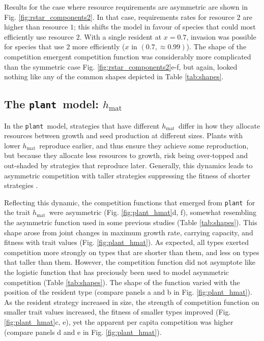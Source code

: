 \documentclass[a4paper,11pt]{article}
\newcommand{\plant}{{\tt plant}}
\newcommand{\hmat}{\ensuremath{h_{\text{mat}}}}
\begin{document}
Results for the case where resource requirements are asymmetric are shown in Fig. \ref{fig:rstar_components2}. In that case, requirements rates for resource $2$ are higher than resource $1$; this shifts the model in favour of species that could most efficiently use resource $2$. With a single resident at $x = 0.7$, invasion was possible for species that use $2$ more efficiently ($x$ in $(0.7, \approx 0.99)$). The shape of the competition emergent competition function was considerably more complicated than the symmetric case Fig. \ref{fig:rstar_components2}e-f, but again, looked nothing like any of the common shapes depicted in Table \ref{tab:shapes}.

\subsection{The \plant\ model: \hmat}

In the \plant\ model, strategies that have different \hmat\ differ in how they allocate resources between growth and seed production at different sizes. Plants with lower \hmat\ reproduce earlier, and thus ensure they achieve some reproduction, but because they allocate less resources to growth, risk being over-topped and out-shaded by strategies that reproduce later. Generally, this dynamics leads to asymmetric competition with taller strategies suppressing the fitness of shorter strategies \cite{Falster-2017}.

Reflecting this dynamic, the competition functions that emerged from \plant\ for the trait \hmat\ were asymmetric (Fig. \ref{fig:plant_hmat}d, f), somewhat resembling the asymmetric function used in some previous studies \citep{Law-1997, Kisdi-1999, Geritz-1999, Egas-2004, Calcagno-2006, DAndrea-2013} (Table \ref{tab:shapes}). This shape arose from joint changes in maximum growth rate, carrying capacity, and fitness with trait values (Fig. \ref{fig:plant_hmat}). As expected, all types exerted competition more strongly on types that are shorter than them, and less on types that taller than them. However, the competition function did not asymptote like the logistic function that has preciously been used to model asymmetric competition (Table \ref{tab:shapes}). The shape of the function varied with the position of the resident type (compare panels a and b in Fig. \ref{fig:plant_hmat}). As the resident strategy increased in size, the strength of competition function on smaller trait values increased, the fitness of smaller types improved (Fig. \ref{fig:plant_hmat}c, e), yet the apparent per capita competition was higher (compare panels d and e in Fig. \ref{fig:plant_hmat}).  
\end{document}
